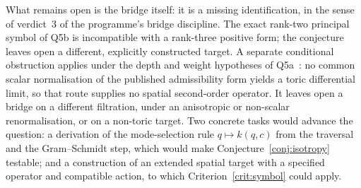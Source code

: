 \documentclass[11pt,a4paper]{article}
\begin{document}
  What remains open is the bridge itself: it is a missing identification, in the sense of
  verdict~3 of the programme's bridge discipline.
  The exact rank-two principal symbol of Q5b is incompatible with a rank-three positive form;
  the conjecture leaves open a different, explicitly constructed target.
  A separate conditional obstruction applies under the depth and
  weight hypotheses of Q5a~\cite{Beau2026q5a}: no common scalar normalisation of the published
  admissibility form yields a toric differential limit, so that route supplies no spatial
  second-order operator.
  It leaves open a bridge on a different filtration, under an anisotropic or non-scalar
  renormalisation, or on a non-toric target.
  Two concrete tasks would advance the question: a derivation of the mode-selection rule
  $q \mapsto k(q,c)$ from the traversal and the Gram--Schmidt step, which would make
  Conjecture~\ref{conj:isotropy} testable; and a construction of an extended spatial target with
  a specified operator and compatible action, to which Criterion~\ref{crit:symbol} could apply.

  \clearpage
  
  
\end{document}
